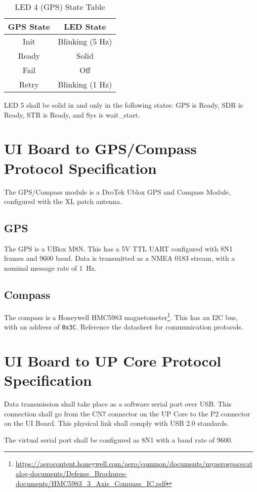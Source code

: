 \documentclass{report}
\begin{document}
				\begin{table}[htp]
					\centering
					\caption{LED 4 (GPS) State Table}
					\label{tbl:led4_states}
					\begin{tabular}{c|c}
						GPS State & LED State \\\hline
						Init & Blinking (5 Hz)\\
						Ready & Solid\\
						Fail & Off\\
						Retry & Blinking (1 Hz)
					\end{tabular}
				\end{table}

				LED 5 shall be solid in and only in the following states: GPS is Ready, SDR is Ready, STR is Ready, and Sys is wait\_start.
		\section{UI Board to GPS/Compass Protocol Specification}\label{sec:ui_gps_mag_comm_spec}
			The GPS/Compass module is a DroTek Ublox GPS and Compass Module, configured with the XL patch antenna.
			\subsection{GPS}
				The GPS is a UBlox M8N.  This has a 5V TTL UART configured with 8N1 frames and 9600 baud.  Data is transmitted as a NMEA 0183 stream, with a nominal message rate of \SI{1}{\Hz}.
			\subsection{Compass}
				The compass is a Honeywell HMC5983 magnetometer\footnote{\url{https://aerocontent.honeywell.com/aero/common/documents/myaerospacecatalog-documents/Defense_Brochures-documents/HMC5983_3_Axis_Compass_IC.pdf}}.  This has an I2C bus, with an address of \lstinline{0x3C}.  Reference the datasheet for communication protocols.
		\section{UI Board to UP Core Protocol Specification}\label{sec:obc_uibrd_comm_spec}
			Data transmission shall take place as a software serial port over USB.  This connection shall go from the CN7 connector on the UP Core to the P2 connector on the UI Board.  This physical link shall comply with USB 2.0 standards.

			The virtual serial port shall be configured as 8N1 with a baud rate of 9600.
\end{document}
